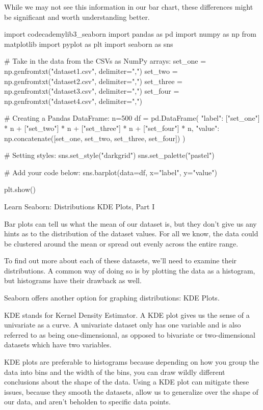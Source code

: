 \documentclass{journal}
\begin{document}
While we may not see this information in our bar chart, these differences might be significant and worth understanding better.


import codecademylib3_seaborn
import pandas as pd
import numpy as np
from matplotlib import pyplot as plt
import seaborn as sns

# Take in the data from the CSVs as NumPy arrays:
set_one = np.genfromtxt("dataset1.csv", delimiter=",")
set_two = np.genfromtxt("dataset2.csv", delimiter=",")
set_three = np.genfromtxt("dataset3.csv", delimiter=",")
set_four = np.genfromtxt("dataset4.csv", delimiter=",")

# Creating a Pandas DataFrame:
n=500
df = pd.DataFrame({
    "label": ["set_one"] * n + ["set_two"] * n + ["set_three"] * n + ["set_four"] * n,
    "value": np.concatenate([set_one, set_two, set_three, set_four])
})

# Setting styles:
sns.set_style("darkgrid")
sns.set_palette("pastel")

# Add your code below:
sns.barplot(data=df, x="label", y="value")

plt.show()

Learn Seaborn: Distributions
KDE Plots, Part I

Bar plots can tell us what the mean of our dataset is, but they don’t give us any hints as to the distribution of the dataset values. For all we know, the data could be clustered around the mean or spread out evenly across the entire range.

To find out more about each of these datasets, we’ll need to examine their distributions. A common way of doing so is by plotting the data as a histogram, but histograms have their drawback as well.

Seaborn offers another option for graphing distributions: KDE Plots.

KDE stands for Kernel Density Estimator. A KDE plot gives us the sense of a univariate as a curve. A univariate dataset only has one variable and is also referred to as being one-dimensional, as opposed to bivariate or two-dimensional datasets which have two variables.

KDE plots are preferable to histograms because depending on how you group the data into bins and the width of the bins, you can draw wildly different conclusions about the shape of the data. Using a KDE plot can mitigate these issues, because they smooth the datasets, allow us to generalize over the shape of our data, and aren’t beholden to specific data points.
\end{document}

